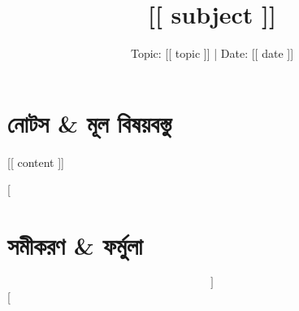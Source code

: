 \documentclass[11pt, a4paper]{article}
\begin{document}
\title{\textbf{\Huge [[ subject ]]}}
\author{Topic: [[ topic ]] | Date: [[ date ]]}
\date{}
\maketitle

\section*{নোটস & মূল বিষয়বস্তু}
[[ content ]]

[%
\section*{সমীকরণ & ফর্মুলা}
\begin{equation}
[[ math_formula ]]
\end{equation}
[%
\end{document}
